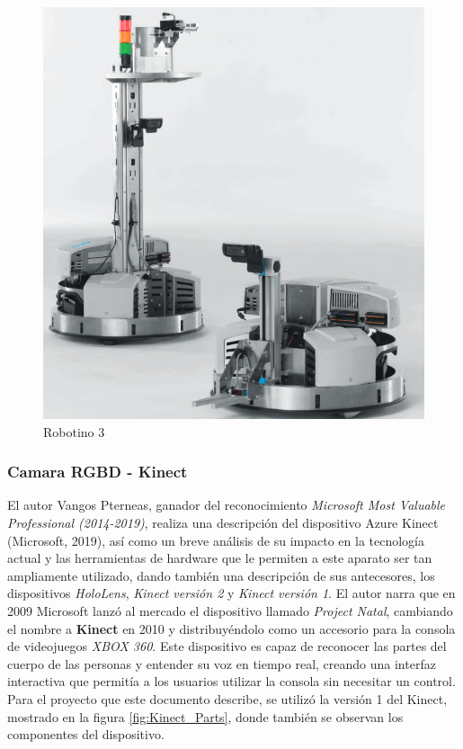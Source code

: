             \begin{figure}[H]
                \centering\includegraphics[scale=0.3]{Figures/RobotinoFESTO_base+torre.png}
                    \caption{Robotino 3}
                    \label{fig:Robotino}
            \end{figure}
                            
            \subsubsection{Camara RGBD - Kinect}

            El autor Vangos Pterneas, ganador del reconocimiento \textit{Microsoft Most Valuable Professional (2014-2019)}, \cite{pterneas_mastering_2022} realiza una descripción del dispositivo Azure Kinect (Microsoft, 2019), así como un breve análisis de su impacto en la tecnología actual y las herramientas de hardware que le permiten a este aparato ser tan ampliamente utilizado, dando también una descripción de sus antecesores, los dispositivos \textit{HoloLens}, \textit{Kinect versión 2} y \textit{Kinect versión 1}.
            El autor narra que en 2009 Microsoft lanzó al mercado el dispositivo llamado \textit{Project Natal}, cambiando el nombre a \textbf{Kinect} en 2010 y distribuyéndolo como un accesorio para la consola de videojuegos \textit{XBOX 360}. Este dispositivo es capaz de reconocer las partes del cuerpo de las personas y entender su voz en tiempo real, creando una interfaz interactiva que permitía a los usuarios utilizar la consola sin necesitar un control. Para el proyecto que este documento describe, se utilizó la versión 1 del Kinect, mostrado en la figura \ref{fig:Kinect_Parts}, donde también se observan los componentes del dispositivo.

